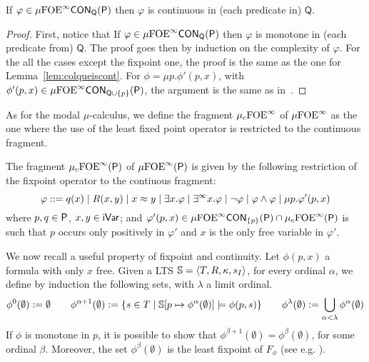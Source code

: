 \begin{lemma}\label{lem:colqueiscont_mu}
If $\varphi \in \mu{\ensuremath{\mathrm{FOE}}}^\infty\mathsf{CON}_{\mathsf{Q}}(\mathsf{P})$ then $\varphi$ is continuous in (each predicate in) $\mathsf{Q}$.
\end{lemma}
%
\begin{proof} First, notice that If $\varphi \in \mu{\ensuremath{\mathrm{FOE}}}^\infty\mathsf{CON}_{\mathsf{Q}}(\mathsf{P})$ then $\varphi$ is monotone  in (each predicate from) $\mathsf{Q}$. %
The proof goes then by induction on the complexity of $\varphi$. For the all the cases except the fixpoint one, the proof is the same as the one for Lemma~\ref{lem:colqueiscont}. For $\phi=\mu p. \phi'(p, x)$, with $\phi'(p,x) \in \mu{\ensuremath{\mathrm{FOE}}}^\infty\mathsf{CON}_{\mathsf{Q} \cup\{p\}}(\mathsf{P})$, the argument is the same as in~\cite[Lemma 1]{Fontaine08}.
\end{proof}

As for the modal $\mu$-calculus, we define the fragment $\mu_{c}{\mathrm{FOE}}^\infty$ of $\mu{\ensuremath{\mathrm{FOE}}}^\infty$ as the one where the use of the least fixed point operator is restricted to the continuous fragment. %

\begin{definition}
The fragment $\mu_{c}{\mathrm{FOE}}^\infty(\mathsf{P})$ of $\mu{\ensuremath{\mathrm{FOE}}}^\infty(\mathsf{P})$ is given by the following restriction of the fixpoint operator to the contiuous fragment:
{\small%
$$
\varphi ::= q(x) \mid R(x,y) \mid x \approx y \mid \exists x.\varphi \mid \exists^\infty x.\varphi \mid \lnot\varphi \mid \varphi \land \varphi \mid \mu p.\varphi'(p,x)
$$}%
where $p,q\in\mathsf{P}$, $x,y\in\mathsf{iVar}$; and $\varphi'(p,x) \in \mu{\ensuremath{\mathrm{FOE}}}^\infty\mathsf{CON}_{\{p\}}(\mathsf{P}) \cap \mu_{c}{\mathrm{FOE}}^\infty(\mathsf{P})$ is such that $p$ occurs only positively in $\varphi'$ and $x$ is the only free variable in $\varphi'$.
\end{definition}

We now recall a useful property of fixpoint and continuity. Let $\phi(p,x)$ a formula with only $x$ free.
Given a LTS $\mathbb{S} = \langle{T,R,\kappa,s_I}\rangle$, for every ordinal $\alpha$, we define by induction the following sets, with $\lambda$ a limit ordinal.
\begin{equation*}
\phi^0(\emptyset):= \emptyset \qquad \phi^{\alpha+1}(\emptyset):= \{ s \in T \mid \mathbb{S}[p \mapsto \phi^\alpha(\emptyset)] \models \phi(p, s)\} \qquad \phi^{\lambda}(\emptyset):= \bigcup_{\alpha < \lambda} \phi^{\alpha}(\emptyset)
\end{equation*}
If $\phi$ is monotone in $p$, it is possible to show that $\phi^{\beta+1}(\emptyset)= \phi^{\beta}(\emptyset)$, for some ordinal $\beta$. Moreover, the set $\phi^{\beta}(\emptyset)$ is the least fixpoint of $F_\phi$ (see e.g. \cite{ArnoldN01}).



